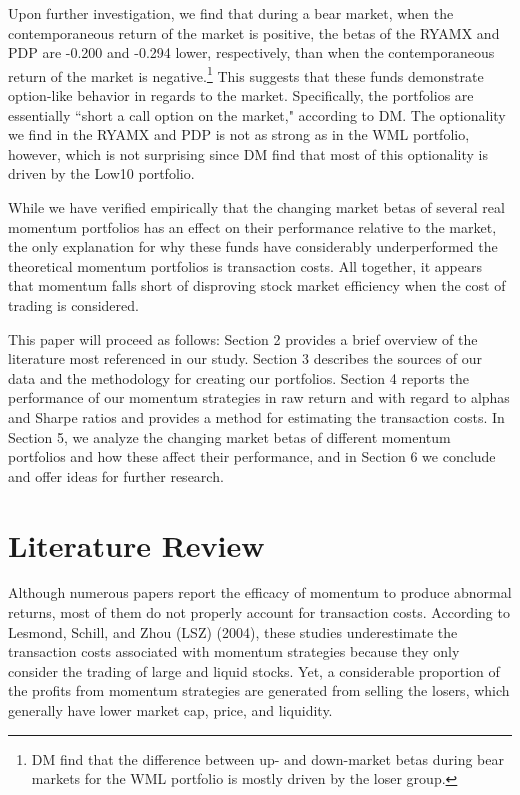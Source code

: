 \documentclass[12pt]{article}
\begin{document}
Upon further investigation, we find that during a bear market, when the contemporaneous return of the market is positive, the betas of the RYAMX and PDP are -0.200 and -0.294 lower, respectively, than when the contemporaneous return of the market is negative.\footnote{DM find that the difference between up- and down-market betas during bear markets for the WML portfolio is mostly driven by the loser group.} This suggests that these funds demonstrate option-like behavior in regards to the market. Specifically, the portfolios are essentially ``short a call option on the market," according to DM. The optionality we find in the RYAMX and PDP is not as strong as in the WML portfolio, however, which is not surprising since DM find that most of this optionality is driven by the Low10 portfolio. 

While we have verified empirically that the changing market betas of several real momentum portfolios has an effect on their performance relative to the market, the only explanation for why these funds have considerably underperformed the theoretical momentum portfolios is transaction costs. All together, it appears that momentum falls short of disproving stock market efficiency when the cost of trading is considered. 

This paper will proceed as follows: Section 2 provides a brief overview of the literature most referenced in our study. Section 3 describes the sources of our data and the methodology for creating our portfolios. Section 4 reports the performance of our momentum strategies in raw return and with regard to alphas and Sharpe ratios and provides a method for estimating the transaction costs. In Section 5, we analyze the changing market betas of different momentum portfolios and how these affect their performance, and in Section 6 we conclude and offer ideas for further research.

\section{Literature Review} %

Although numerous papers report the efficacy of momentum to produce abnormal returns, most of them do not properly account for transaction costs. According to Lesmond, Schill, and Zhou (LSZ) (2004), these studies underestimate the transaction costs associated with momentum strategies because they only consider the trading of large and liquid stocks. Yet, a considerable proportion of the profits from momentum strategies are generated from selling the losers, which generally have lower market cap, price, and liquidity. 
\end{document}
